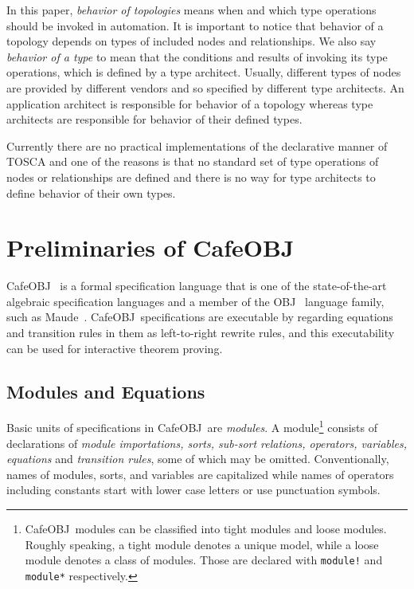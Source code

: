 \documentclass[12pt]{report}
\newcommand{\cafeobj}{{\sf CafeOBJ}~}
\begin{document}
In this paper, {\it behavior of topologies} means when
and which type operations should be invoked in automation. It is
important to notice that behavior of a topology depends
on types of included nodes and relationships. We also say
{\it behavior of a type} to mean that the conditions and
results of invoking its type operations, which is defined by a type
architect. Usually, different types of nodes are provided by different
vendors and so specified by different type architects. An application
architect is responsible for behavior of a topology
whereas type architects are responsible for behavior of
their defined types.

Currently there are no practical implementations of the declarative
manner of TOSCA and one of the reasons is that no standard set of type
operations of nodes or relationships are defined and there is no way
for type architects to define behavior of their own types.

\chapter{Preliminaries of \cafeobj}
\label{chap:pre}
\cafeobj\cite{cafeobj} is a formal specification language that is one
of the state-of-the-art algebraic specification languages and a member
of the {\sf OBJ}~\cite{OBJ} language family, such as {\sf
  Maude}~\cite{Maude14}.  \cafeobj specifications are executable by
regarding equations and transition rules in them as left-to-right
rewrite rules, and this executability can be used for interactive
theorem proving.

\section{Modules and Equations}
\label{sec:module}
Basic units of specifications in \cafeobj are {\it modules}.  A
module\footnote{\cafeobj modules can be classified into tight modules
  and loose modules. Roughly speaking, a tight module denotes a unique
  model, while a loose module denotes a class of modules. Those are
  declared with {\tt module!} and {\tt module*} respectively.}
consists of declarations of {\it module importations, sorts, sub-sort
  relations, operators, variables, equations} and {\it transition
  rules}, some of which may be omitted. Conventionally, names of
modules, sorts, and variables are capitalized while names of operators
including constants start with lower case letters or use punctuation
symbols.
\end{document}
